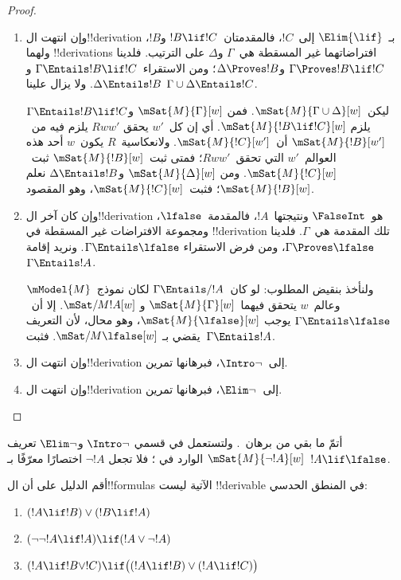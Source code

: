 \documentclass[../../../include/open-logic-section]{subfiles}
\begin{document}
\begin{proof}
\begin{enumerate}
  \item وإن انتهت ال!!{derivation} بـ~$\Elim{\lif}$ إلى~$!C$،
    فالمقدمتان~$!B \lif !C$ و$!B$، ولهما !!{derivation}s افتراضاتهما
    غير المسقطة هي~$\Gamma$ و$\Delta$ على الترتيب. فلدينا
    $\Gamma \Proves !B \lif !C$ و$\Delta \Proves !B$؛ ومن
    الاستقراء~$\Gamma \Entails !B \lif !C$ و
    $\Delta \Entails !B$. ولا يزال علينا
    $\Gamma \cup \Delta \Entails !C$.

    ليكن~$\mSat{M}{\Gamma \cup \Delta}[w]$. فمن
    $\mSat{M}{\Gamma}[w]$ و$\Gamma \Entails !B \lif !C$ يلزم
    $\mSat{M}{!B \lif !C}[w]$. أي إن كل~$w'$ يحقق
    $Rww'$ يلزم فيه من~$\mSat{M}{!B}[w']$ أن~$\mSat{M}{!C}[w']$.
    ولانعكاسية~$R$ يكون~$w$ أحد هذه العوالم~$w'$ التي تحقق~$Rww'$؛
    فمتى ثبت~$\mSat{M}{!B}[w]$ ثبت~$\mSat{M}{!C}[w]$. ومن
    $\mSat{M}{\Delta}[w]$ و$\Delta \Entails !B$ نعلم
    $\mSat{M}{!B}[w]$؛ فثبت~$\mSat{M}{!C}[w]$، وهو المقصود.

  \item وإن كان آخر ال!!{derivation} هو~$\FalseInt$ ونتيجتها~$!A$،
    فالمقدمة~$\lfalse$، ومجموعة الافتراضات غير المسقطة في
    !!{derivation} تلك المقدمة هي~$\Gamma$. فلدينا
    $\Gamma \Proves \lfalse$، ومن فرض الاستقراء
    $\Gamma \Entails \lfalse$. ونريد إقامة
    $\Gamma \Entails !A$.

    ولنأخذ بنقيض المطلوب: لو كان~$\Gamma \Entails/ !A$ لكان
    نموذج~$\mModel{M}$ وعالم~$w$ يتحقق فيهما~$\mSat{M}{\Gamma}[w]$ و
    $\mSat/{M}{!A}[w]$. إلا أن~$\Gamma \Entails \lfalse$ يوجب
    $\mSat{M}{\lfalse}[w]$، وهو محال، لأن التعريف يقضي بـ
    $\mSat/{M}{\lfalse}[w]$. فثبت~$\Gamma \Entails !A$.
  \item وإن انتهت ال!!{derivation} إلى~$\Intro\lnot$، فبرهانها تمرين.
  \item وإن انتهت ال!!{derivation} إلى~$\Elim\lnot$، فبرهانها تمرين.
  \end{enumerate}
\end{proof}

\begin{prob}
  أتمّ ما بقي من برهان~. ولتستعمل في قسمي
  $\Intro\lnot$ و$\Elim\lnot$ تعريف
  $\mSat{M}{\lnot !A}[w]$ الوارد في
  ؛ فلا تجعل
  $\lnot !A$ اختصارًا معرّفًا بـ~$!A \lif \lfalse$.
\end{prob}

\begin{prob}
  أقم الدليل على أن ال!!{formula}s الآتية ليست !!{derivable} في المنطق
  الحدسي:
  \begin{enumerate}
    \item $(!A \lif !B) \lor (!B \lif !A)$
    \item $(\lnot\lnot !A \lif !A) \lif (!A \lor \lnot !A)$
    \item $(!A \lif !B \lor !C) \lif \bigl((!A \lif !B)\lor(!A \lif !C)\bigr)$
  \end{enumerate}
\end{prob}
\end{document}
